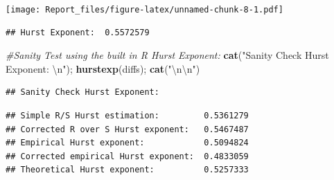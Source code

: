 \documentclass[]{article}
\newenvironment{Shaded}{\begin{snugshade}}{\end{snugshade}}
\newcommand{\CharTok}[1]{\textcolor[rgb]{0.31,0.60,0.02}{#1}}
\newcommand{\CommentTok}[1]{\textcolor[rgb]{0.56,0.35,0.01}{\textit{#1}}}
\newcommand{\DecValTok}[1]{\textcolor[rgb]{0.00,0.00,0.81}{#1}}
\newcommand{\KeywordTok}[1]{\textcolor[rgb]{0.13,0.29,0.53}{\textbf{#1}}}
\newcommand{\NormalTok}[1]{#1}
\newcommand{\OperatorTok}[1]{\textcolor[rgb]{0.81,0.36,0.00}{\textbf{#1}}}
\newcommand{\StringTok}[1]{\textcolor[rgb]{0.31,0.60,0.02}{#1}}
\begin{document}
\texttt{[image: Report\_files/figure-latex/unnamed-chunk-8-1.pdf]}

\begin{Shaded}
\end{Shaded}

\begin{verbatim}
## Hurst Exponent:  0.5572579
\end{verbatim}

\begin{Shaded}
\begin{Highlighting}[]
\CommentTok{#Sanity Test using the built in R Hurst Exponent:}
\KeywordTok{cat}\NormalTok{(}\StringTok{"Sanity Check Hurst Exponent: }\CharTok{\textbackslash{}n}\StringTok{"}\NormalTok{); }\KeywordTok{hurstexp}\NormalTok{(diffs); }\KeywordTok{cat}\NormalTok{(}\StringTok{"}\CharTok{\textbackslash{}n\textbackslash{}n}\StringTok{"}\NormalTok{)}
\end{Highlighting}
\end{Shaded}

\begin{verbatim}
## Sanity Check Hurst Exponent:
\end{verbatim}

\begin{verbatim}
## Simple R/S Hurst estimation:         0.5361279 
## Corrected R over S Hurst exponent:   0.5467487 
## Empirical Hurst exponent:            0.5094824 
## Corrected empirical Hurst exponent:  0.4833059 
## Theoretical Hurst exponent:          0.5257333
\end{verbatim}
\end{document}

